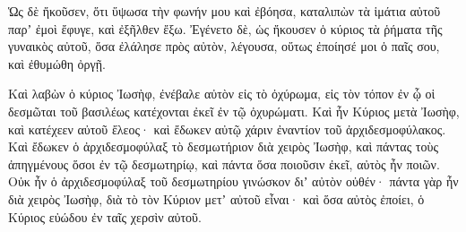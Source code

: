 {Ὡς δὲ ἤκοῦσεν, ὅτι ὕψωσα τὴν φωνήν μου καὶ ἐβόησα, καταλιπὼν τὰ ἱμάτια αὐτοῦ παρʼ ἐμοὶ ἔφυγε, καὶ ἐξῆλθεν ἔξω.
Ἐγένετο δὲ, ὡς ἤκουσεν ὁ κύριος τὰ ῥήματα τῆς γυναικὸς αὐτοῦ, ὅσα ἐλάλησε πρὸς αὐτὸν, λέγουσα, οὕτως ἐποίησέ μοι ὁ παῖς σου, καὶ ἐθυμώθη ὀργῇ.
\par }{\PP {}Καὶ λαβὼν ὁ κύριος Ἰωσὴφ, ἐνέβαλε αὐτὸν εἰς τὸ ὀχύρωμα, εἰς τὸν τόπον ἐν ᾧ οἱ δεσμῶται τοῦ βασιλέως κατέχονται ἐκεῖ ἐν τῷ ὀχυρώματι.
Καὶ ἦν Κύριος μετὰ Ἰωσὴφ, καὶ κατέχεεν αὐτοῦ ἔλεος· καὶ ἔδωκεν αὐτῷ χάριν ἐναντίον τοῦ ἀρχιδεσμοφύλακος.
Καὶ ἔδωκεν ὁ ἀρχιδεσμοφύλαξ τὸ δεσμωτήριον διὰ χειρὸς Ἰωσὴφ, καὶ πάντας τοὺς ἀπηγμένους ὅσοι ἐν τῷ δεσμωτηρίῳ, καὶ πάντα ὅσα ποιοῦσιν ἐκεῖ, αὐτὸς ἦν ποιῶν.
Οὐκ ἦν ὁ ἀρχιδεσμοφύλαξ τοῦ δεσμωτηρίου γινώσκον διʼ αὐτὸν οὐθέν· πάντα γὰρ ἦν διὰ χειρὸς Ἰωσὴφ, διὰ τὸ τὸν Κύριον μετʼ αὐτοῦ εἶναι· καὶ ὅσα αὐτὸς ἐποίει, ὁ Κύριος εὐώδου ἐν ταῖς χερσὶν αὐτοῦ.

}
